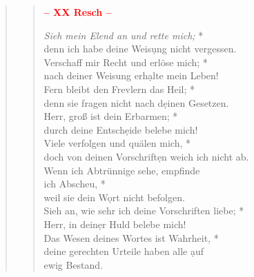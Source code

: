 \begin{quote}
 
 \begin{verse}

\begin{center}
 \textcolor{red}{\normalsize\bf – XX Resch –}\\
\end{center}


\textit{Sieh mein Elend an und rette mich;} *\\
denn ich habe deine Weis\d ung nicht vergessen.\\ \vin
Verschaff mir Recht und erlöse mich; *\\ \vin
nach deiner Weisung erh\d alte mein Leben!\\
Fern bleibt den Frevlern das Heil; *\\
denn sie fragen nicht nach d\d einen Gesetzen.\\ \vin
Herr, groß ist dein Erbarmen; *\\ \vin
durch deine Entsch\d eide belebe mich!\\
Viele verfolgen und quälen mich, *\\
doch von deinen Vorschrift\d en weich ich nicht ab.\\ \vin
Wenn ich Abtrünnige sehe, empfinde\\ \vin ich Abscheu, *\\ \vin
weil sie dein W\d ort nicht befolgen.\\ 
Sieh an, wie sehr ich deine Vorschriften liebe; *\\
Herr, in dein\d er Huld belebe mich!\\ \vin
Das Wesen deines Wortes ist Wahrheit, *\\ \vin
deine gerechten Urteile haben alle \d auf \\ \vin ewig Bestand.\\ 

\vspace{0.3cm}


\end{verse}
\end{quote}
